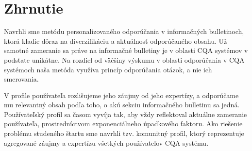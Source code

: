 \section{Zhrnutie}

Navrhli sme metódu personalizovaného odporúčania v informačných bulletinoch, ktorá kladie dôraz na diverzifikáciu
a aktuálnosť odporúčaného obsahu. Už samotné zameranie sa práve na informačné bulletiny je v oblasti CQA systémov
v podstate unikátne. Na rozdiel od väčšiny výskumu v oblasti odporúčania v CQA systémoch naša metóda využíva
princíp odporúčania otázok, a nie ich smerovania.

V profile používateľa rozlišujeme jeho záujmy od jeho expertízy,
a odporúčame mu relevantný obsah podľa toho, o akú sekciu informačného bulletinu sa jedná.
Používateľský profil sa časom vyvíja tak, aby vždy reflektoval aktuálne zameranie používateľa, prostredníctvom
exponenciálneho úpadkového faktoru. Ako riešenie problému studeného štartu sme navrhli tzv. komunitný profil,
ktorý reprezentuje agregované záujmy a expertízu všetkých používateľov CQA systému.

